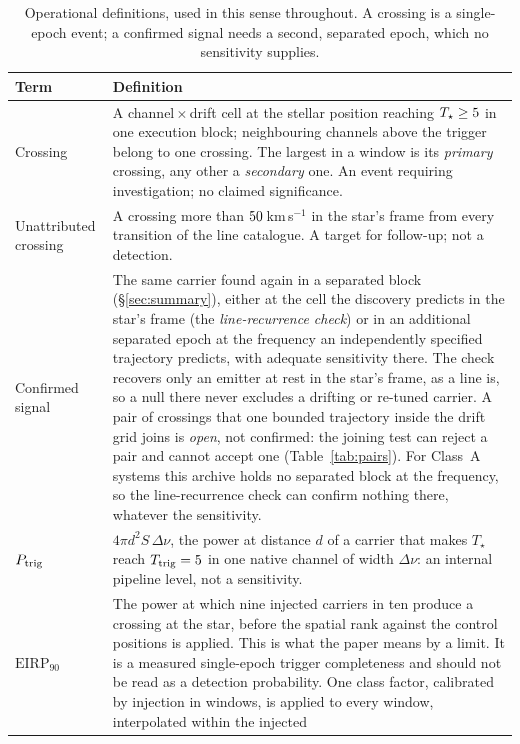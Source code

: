 \begin{table}
\centering
\caption{Operational definitions, used in this sense throughout. A crossing is
a single-epoch event; a confirmed signal needs a second, separated epoch,
which no sensitivity supplies.}
\label{tab:quantities}
\small
\begin{tabular}{@{}p{}p{}@{}}
\hline
Term & Definition \\
\hline
Crossing &
A channel\,$\times$\,drift cell at the stellar position reaching
$T_\star\geq5$ in one execution block; neighbouring channels
above the trigger belong to one crossing. The largest in a window is its
\emph{primary} crossing, any other a \emph{secondary} one. An event requiring
investigation; no claimed significance. \\
Unattributed crossing &
A crossing more than $50$\,km\,s$^{-1}$ in the star's frame from
every transition of the line catalogue. A target for follow-up; not a
detection. \\
Confirmed signal &
The same carrier found again in a separated block (\S\ref{sec:summary}),
either at the cell the discovery predicts in the star's frame (the
\emph{line-recurrence check}) or in an additional separated epoch at the
frequency an independently specified trajectory predicts, with adequate
sensitivity there. The check recovers only an emitter at rest in the star's
frame, as a line is, so a null there never excludes a drifting or re-tuned
carrier. A pair of crossings that one bounded trajectory inside the drift
grid joins is \emph{open}, not confirmed: the joining test can reject a pair
and cannot accept one (Table~\ref{tab:pairs}). For \ZcNoRepSys{} Class~A
systems this archive holds no separated block at the frequency, so the
line-recurrence check can confirm nothing there, whatever the sensitivity. \\
$P_{\rm trig}$ &
$4\pi d^{2}S\,\Delta\nu$, the power at distance $d$ of a carrier that makes
$T_\star$ reach $T_{\rm trig}=5$ in one native channel of width
$\Delta\nu$: an internal pipeline level, not a sensitivity. \\
$\mathrm{EIRP}_{90}$ &
The power at which nine injected carriers in ten produce a crossing at the
star, before the spatial rank against the control positions is applied. This
is what the paper means by a limit. It is a measured single-epoch trigger
completeness and should not be read as a detection probability. One class factor, calibrated by injection in \SensNInj{}
windows, is applied to every window, interpolated within the injected

\end{tabular}
\end{table}
